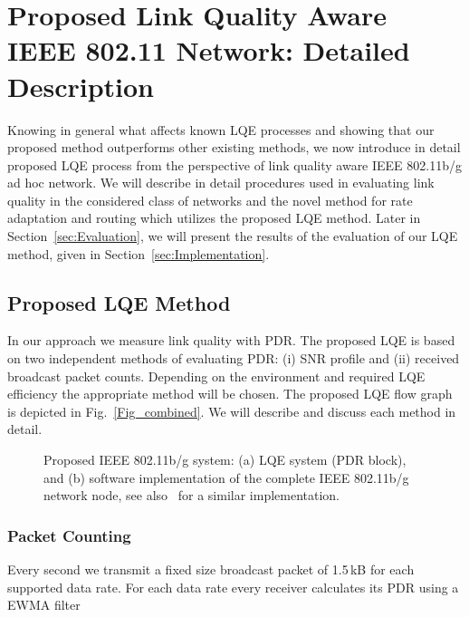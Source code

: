\documentclass[11pt,draftclsnofoot,journal,onecolumn]{IEEEtran}
\begin{document}
\section{Proposed Link Quality Aware IEEE 802.11 Network: Detailed Description}
\label{sec:Proposed_system}

Knowing in general what affects known LQE processes and showing that our proposed method outperforms other existing methods, we now introduce in detail proposed LQE process from the perspective of link quality aware IEEE 802.11b/g ad hoc network. We will describe in detail procedures used in evaluating link quality in the considered class of networks and the novel method for rate adaptation and routing which utilizes the proposed LQE method. Later in Section~\ref{sec:Evaluation}, we will present the results of the evaluation of our LQE method, given in Section~\ref{sec:Implementation}.

\subsection{Proposed LQE Method}
\label{sec:lqe_proposed}

In our approach we measure link quality with PDR. The proposed LQE is based on two independent methods of evaluating PDR: (i) SNR profile and (ii) received broadcast packet counts. Depending on the environment and required LQE efficiency the appropriate method will be chosen. The proposed LQE flow graph is depicted in Fig.~\ref{Fig_combined}.  We will describe and discuss each method in detail.
\begin{figure}
\centering
{}
\caption{Proposed IEEE 802.11b/g system: (a) LQE system (PDR block), and (b) software implementation of the complete IEEE 802.11b/g network node, see also~\cite[Fig. 1]{zhou_2009_CCNC} for a similar implementation.}
\end{figure}

\subsubsection{Packet Counting}
\label{sec:packet_counting}

Every second we transmit a fixed size broadcast packet of 1.5\,kB for each supported data rate. For each data rate every receiver calculates its PDR using a EWMA filter
\end{document}
